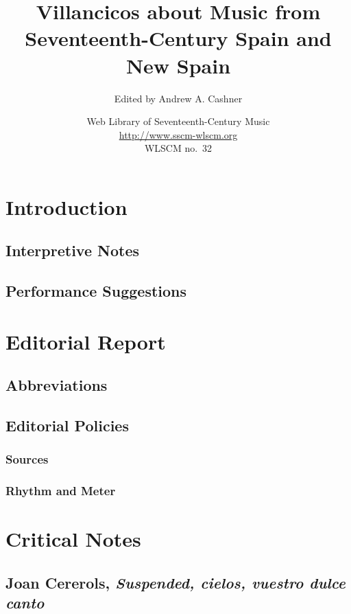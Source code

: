 \documentclass[12pt,oneside]{book}
\title{Villancicos about Music from 
Seventeenth-Century Spain and New Spain}
\author{Edited by Andrew A. Cashner}
\date{Web Library of Seventeenth-Century Music\\
\url{http://www.sscm-wlscm.org}\\
WLSCM no.~32\\
\number\year}
\begin{document}
\maketitle

\tableofcontents

\chapter{Introduction}
\lipsum[1]

\section{Interpretive Notes}
\lipsum[1]

\section{Performance Suggestions}
\lipsum[1]

\chapter{Editorial Report}

\section{Abbreviations}
\lipsum[1]

\section{Editorial Policies}
\lipsum[1]

\subsection{Sources}
\lipsum[1]

\subsection{Rhythm and Meter}
\lipsum[1]

\chapter{Critical Notes}

\section{Joan Cererols, \emph{Suspended, cielos, vuestro dulce canto}}
\lipsum
\end{document}
